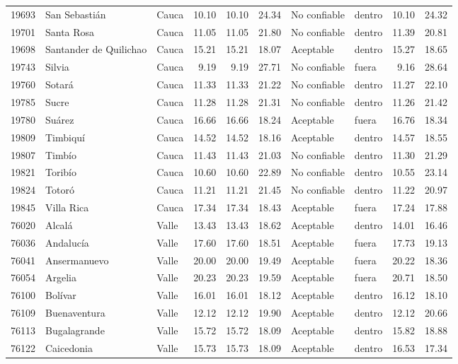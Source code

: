 {\begin{longtable}{l p{3.0cm} l r r r l l r r}
19693 & San Sebastián & Cauca & 10.10 & 10.10 & 24.34 & No confiable & dentro & 10.10 & 24.32 \\
19701 & Santa Rosa & Cauca & 11.05 & 11.05 & 21.80 & No confiable & dentro & 11.39 & 20.81 \\
19698 & Santander de Quilichao & Cauca & 15.21 & 15.21 & 18.07 & Aceptable & dentro & 15.27 & 18.65 \\
19743 & Silvia & Cauca & 9.19 & 9.19 & 27.71 & No confiable & fuera & 9.16 & 28.64 \\
19760 & Sotará & Cauca & 11.33 & 11.33 & 21.22 & No confiable & dentro & 11.27 & 22.10 \\
19785 & Sucre & Cauca & 11.28 & 11.28 & 21.31 & No confiable & dentro & 11.26 & 21.42 \\
19780 & Suárez & Cauca & 16.66 & 16.66 & 18.24 & Aceptable & fuera & 16.76 & 18.34 \\
19809 & Timbiquí & Cauca & 14.52 & 14.52 & 18.16 & Aceptable & dentro & 14.57 & 18.55 \\
19807 & Timbío & Cauca & 11.43 & 11.43 & 21.03 & No confiable & dentro & 11.30 & 21.29 \\
19821 & Toribío & Cauca & 10.60 & 10.60 & 22.89 & No confiable & dentro & 10.55 & 23.14 \\
19824 & Totoró & Cauca & 11.21 & 11.21 & 21.45 & No confiable & dentro & 11.22 & 20.97 \\
19845 & Villa Rica & Cauca & 17.34 & 17.34 & 18.43 & Aceptable & fuera & 17.24 & 17.88 \\
76020 & Alcalá & Valle & 13.43 & 13.43 & 18.62 & Aceptable & dentro & 14.01 & 16.46 \\
76036 & Andalucía & Valle & 17.60 & 17.60 & 18.51 & Aceptable & fuera & 17.73 & 19.13 \\
76041 & Ansermanuevo & Valle & 20.00 & 20.00 & 19.49 & Aceptable & fuera & 20.22 & 18.36 \\
76054 & Argelia & Valle & 20.23 & 20.23 & 19.59 & Aceptable & fuera & 20.71 & 18.50 \\
76100 & Bolívar & Valle & 16.01 & 16.01 & 18.12 & Aceptable & dentro & 16.12 & 18.10 \\
76109 & Buenaventura & Valle & 12.12 & 12.12 & 19.90 & Aceptable & dentro & 12.12 & 20.66 \\
76113 & Bugalagrande & Valle & 15.72 & 15.72 & 18.09 & Aceptable & dentro & 15.82 & 18.88 \\
76122 & Caicedonia & Valle & 15.73 & 15.73 & 18.09 & Aceptable & dentro & 16.53 & 17.34 \\

\end{longtable}}
